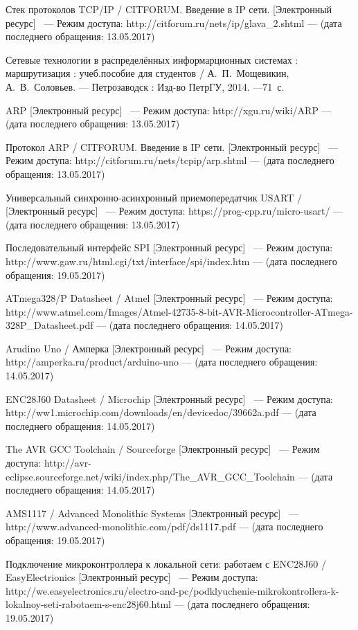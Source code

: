\documentclass[utf8x,12pt, coursreport]{G7-32}
\begin{document}
\begin{thebibliography}{99}
 Стек протоколов TCP/IP / CITFORUM. Введение в IP сети. [Электронный ресурс] ~--- Режим доступа: http://citforum.ru/nets/ip/glava\_2.shtml --- (дата последнего обращения: 13.05.2017)

 Сетевые технологии в распределённых информарционных системах : маршрутизация : учеб.пособие для студентов / А.~П.~Мощевикин, А.~В.~Соловьев. --- Петрозаводск : Изд-во ПетрГУ, 2014. ---71~с.

 ARP [Электронный ресурс] ~--- Режим доступа: http://xgu.ru/wiki/ARP --- (дата последнего обращения: 13.05.2017)

  Протокол ARP  / CITFORUM. Введение в IP сети. [Электронный ресурс] ~--- Режим доступа: http://citforum.ru/nets/tcpip/arp.shtml --- (дата последнего обращения: 13.05.2017)

 Универсальный синхронно-асинхронный приемопередатчик USART / [Электронный ресурс] ~--- Режим доступа: https://prog-cpp.ru/micro-usart/ --- (дата последнего обращения: 13.05.2017)

 Последовательный интерфейс SPI [Электронный ресурс] ~--- Режим доступа: http://www.gaw.ru/html.cgi/txt/interface/spi/index.htm --- (дата последнего обращения: 19.05.2017)

 ATmega328/P Datasheet / Atmel [Электронный ресурс] ~--- Режим доступа: http://www.atmel.com/Images/Atmel-42735-8-bit-AVR-Micro\-controller-\-AT\-me\-ga-328P\_Datasheet.pdf --- (дата последнего обращения: 14.05.2017)

 Arudino Uno / Амперка [Электронный ресурс] ~--- Режим доступа: http://amperka.ru/product/arduino-uno --- (дата последнего обращения: 14.05.2017)

 ENC28J60 Datasheet / Microchip  [Электронный ресурс] ~--- Режим доступа: http://ww1.microchip.com/downloads/en/devicedoc/39662a.pdf --- (дата последнего обращения: 14.05.2017)

 The AVR GCC Toolchain / Sourceforge [Электронный ресурс] ~--- Режим доступа: http://avr-eclipse.sourceforge.net/wiki/index.php/The\_AVR\_GCC\_Toolchain --- (дата последнего обращения: 14.05.2017)

 AMS1117 / Advanced Monolithic Systems [Электронный ресурс] ~--- http://www.advanced-monolithic.com/pdf/ds1117.pdf --- (дата последнего обращения: 19.05.2017)

 Подключение микроконтроллера к локальной сети: работаем с ENC28J60  / EasyElectrionics [Электронный ресурс] ~--- Режим доступа: http://we.easyelectronics.ru/electro-and-pc/podklyuchenie-mikrok\-ont\-ro\-lle\-ra-k-lo\-ka\-lnoy-se\-ti-ra\-botaem-s-enc28j60.html --- (дата последнего обращения: 19.05.2017)

\end{thebibliography}
\end{document}

